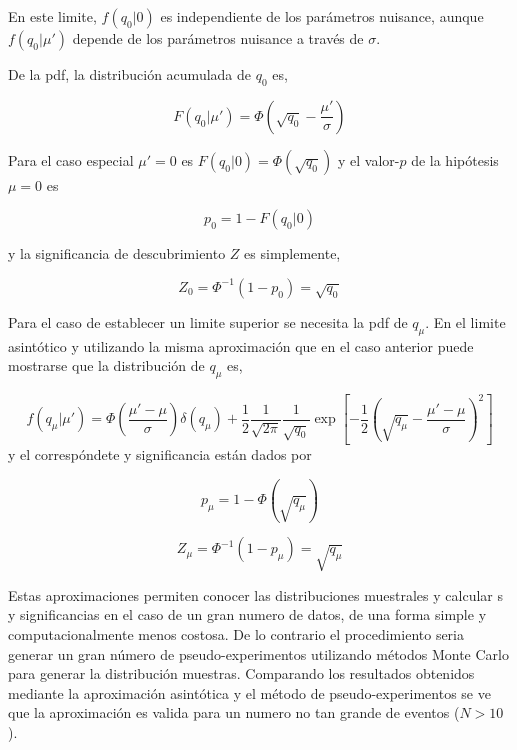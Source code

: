 En este limite, $f(q_0|0)$ es independiente de los parámetros
nuisance, aunque $f(q_0|\mu')$ depende de los parámetros nuisance a través de
$\sigma$.

De la pdf, la distribución acumulada de $q_0$ es,

\begin{equation}
  F(q_0|\mu') = \Phi \left( \sqrt{q_0} - \frac{\mu'}{\sigma} \right)
\end{equation}

Para el caso especial $\mu' = 0$ es $F(q_0|0) = \Phi(\sqrt{q_0})$ y el valor-$p$
de la hipótesis $\mu=0$ es

\begin{equation}
  p_0 = 1 - F(q_0|0)
\end{equation}

y la significancia de descubrimiento $Z$ es simplemente,

\begin{equation}
  Z_0 = \Phi^{-1} (1-p_0) = \sqrt{q_0}
\end{equation}

Para el caso de establecer un limite superior se necesita la pdf de $q_\mu$. En el
limite asintótico y utilizando la misma aproximación que en el caso anterior puede
mostrarse que la distribución de $q_\mu$ es,

\begin{equation}
  f(q_\mu|\mu') = \Phi\left(\frac{\mu'-\mu}{\sigma}\right) \delta(q_\mu) +
  \frac{1}{2}\frac{1}{\sqrt{2\pi}}\frac{1}{\sqrt{q_0}} \exp \left[ -\frac{1}{2}
    \left( \sqrt{q_\mu} - \frac{\mu'-\mu}{\sigma} \right)^2\right]
\end{equation}
%
y el correspóndete {\pvalue} y significancia están dados por

\begin{equation}
  p_\mu = 1 - \Phi(\sqrt{q_\mu})
\end{equation}

\begin{equation}
  Z_\mu = \Phi^{-1}(1-p_\mu) = \sqrt{q_\mu}
\end{equation}

Estas aproximaciones permiten conocer las distribuciones muestrales
y calcular {\pvalues}s y significancias en el caso de un gran numero de datos,
de una forma simple y computacionalmente menos costosa. De lo contrario
el procedimiento seria generar un gran número de pseudo-experimentos utilizando
métodos Monte Carlo para generar la distribución muestras.
Comparando los resultados obtenidos mediante la aproximación asintótica y
el método de pseudo-experimentos se ve que la aproximación es valida
para un numero no tan grande de eventos ($N > 10$)\cite{AsymAprox}.


